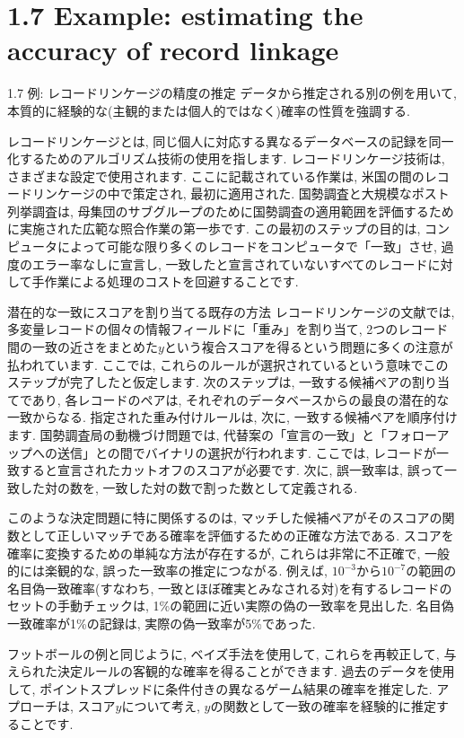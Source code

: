 \documentclass[10pt,dvipdfmx,a4]{beamer}
\begin{document}
\section{1.7 Example: estimating the accuracy of record linkage}
\begin{frame}{1.7 例: レコードリンケージの精度の推定}
データから推定される別の例を用いて, 本質的に経験的な(主観的または個人的ではなく)確率の性質を強調する.

レコードリンケージとは, 同じ個人に対応する異なるデータベースの記録を同一化するためのアルゴリズム技術の使用を指します.
レコードリンケージ技術は, さまざまな設定で使用されます.
ここに記載されている作業は, 米国の間のレコードリンケージの中で策定され, 最初に適用された.
国勢調査と大規模なポスト列挙調査は, 母集団のサブグループのために国勢調査の適用範囲を評価するために実施された広範な照合作業の第一歩です.
この最初のステップの目的は, コンピュータによって可能な限り多くのレコードをコンピュータで「一致」させ, 過度のエラー率なしに宣言し, 一致したと宣言されていないすべてのレコードに対して手作業による処理のコストを回避することです.
\end{frame}


\begin{frame}{潜在的な一致にスコアを割り当てる既存の方法}
レコードリンケージの文献では, 多変量レコードの個々の情報フィールドに「重み」を割り当て, 2つのレコード間の一致の近さをまとめた$y$という複合スコアを得るという問題に多くの注意が払われています.
ここでは, これらのルールが選択されているという意味でこのステップが完了したと仮定します.
次のステップは, 一致する候補ペアの割り当てであり, 各レコードのペアは, それぞれのデータベースからの最良の潜在的な一致からなる.
指定された重み付けルールは, 次に, 一致する候補ペアを順序付けます.
国勢調査局の動機づけ問題では, 代替案の「宣言の一致」と「フォローアップへの送信」との間でバイナリの選択が行われます.
ここでは, レコードが一致すると宣言されたカットオフのスコアが必要です.
次に, 誤一致率は, 誤って一致した対の数を, 一致した対の数で割った数として定義される.
\end{frame}


\begin{frame}
このような決定問題に特に関係するのは, マッチした候補ペアがそのスコアの関数として正しいマッチである確率を評価するための正確な方法である.
スコアを確率に変換するための単純な方法が存在するが, これらは非常に不正確で, 一般的には楽観的な, 誤った一致率の推定につながる.
例えば, $10^{-3}$から$10^{-7}$の範囲の名目偽一致確率(すなわち, 一致とほぼ確実とみなされる対)を有するレコードのセットの手動チェックは, 1\%の範囲に近い実際の偽の一致率を見出した.
名目偽一致確率が1\%の記録は, 実際の偽一致率が5\%であった.

フットボールの例と同じように, ベイズ手法を使用して, これらを再較正して, 与えられた決定ルールの客観的な確率を得ることができます.
過去のデータを使用して, ポイントスプレッドに条件付きの異なるゲーム結果の確率を推定した.
アプローチは, スコア$y$について考え, $y$の関数として一致の確率を経験的に推定することです.
\end{frame}
\end{document}
